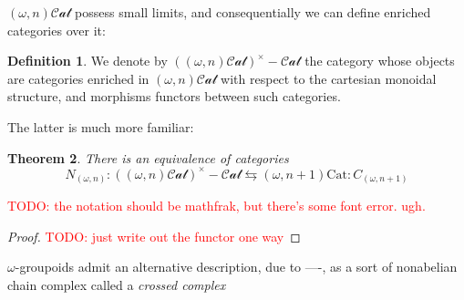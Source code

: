 \documentclass[12pt]{article}
\newtheorem{theorem}{Theorem}[section]
\theoremstyle{definition}
\newtheorem{definition}[theorem]{Definition}
\newcommand{\TODO}[1]{\textcolor{red}{TODO: {#1}}}
\newcommand{\omegancat}[1]{(\omega,#1)\mathcal{Cat}}
\newcommand{\cartesiancat}[1]{((\omega, #1)\mathcal{Cat})^\times{-}\mathcal{Cat}}
\newcommand{\omegannerve}[1]{N_{(\omega,#1)}}
\newcommand{\omeganrigidification}[1]{C_{(\omega,#1)}}
\begin{document}
	$\omegancat{n}$ possess small limits, and consequentially we can define enriched categories over it:
	\begin{definition}
		We denote by $\cartesiancat{n}$ the category whose objects are categories enriched in $\omegancat{n}$ with respect to the cartesian monoidal structure, and morphisms functors between such categories. 
	\end{definition}
	The latter is much more familiar:
	\begin{theorem}\label{enriched-strict-equivalence}
		There is an equivalence of categories
			$$\omegannerve{n}:\cartesiancat{n} \leftrightarrows (\omega,n+1)\text{Cat}: \omeganrigidification{n+1}$$
	\end{theorem}
	\TODO{the notation should be mathfrak, but there's some font error. ugh.}
	\begin{proof}
		\TODO{just write out the functor one way}
	\end{proof}
	$\omega$-groupoids admit an alternative description, due to ----, as a sort of nonabelian chain complex called a \textit{crossed complex}
\end{document}
